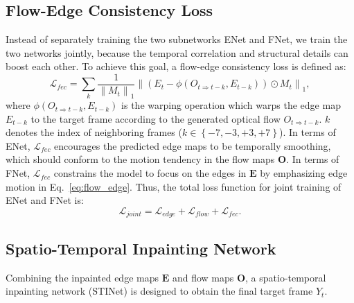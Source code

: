 \subsection{Flow-Edge Consistency Loss}

Instead of separately training the two subnetworks ENet and FNet, we train the two networks jointly, because the temporal correlation and structural details can boost each other.
To achieve this goal, a flow-edge consistency loss is defined as:
%
\begin{equation}
	\label{eq:flow_edge}
	\mathcal{L}_{fec}=\sum_{k}\frac{1}{\left\|M_{t} \right\|_1}\left\|(E_{t}-\phi(O_{t\Rightarrow t-k},E_{t-k}))\odot M_{t}\right\|_1,
\end{equation}
where $\phi(O_{t\Rightarrow t-k},E_{t-k})$ is the warping operation which warps the edge map $E_{t-k}$ to the target frame according to the generated optical flow $O_{t\Rightarrow t-k}$.
$k$ denotes the index of neighboring frames ($k\in \left\{-7,-3,+3,+7 \right\}$). 
In terms of ENet, $\mathcal{L}_{fec}$ encourages the predicted edge maps to be temporally smoothing, which should conform to the motion tendency in the flow maps $\boldsymbol{O}$. 
In terms of FNet, $\mathcal{L}_{fec}$ constrains the model to focus on the edges in $\boldsymbol{E}$ by emphasizing edge motion in Eq.~\ref{eq:flow_edge}. 
Thus, the total loss function for joint training of ENet and FNet is:
\begin{equation}
	\label{eq:flow}
	\mathcal{L}_{joint}=\mathcal{L}_{edge}+\mathcal{L}_{flow}+ \mathcal{L}_{fec}.
\end{equation}







\subsection{Spatio-Temporal Inpainting Network}

Combining the inpainted edge maps $\boldsymbol{E}$ and flow maps $\boldsymbol{O}$, a spatio-temporal inpainting network (STINet) is designed to obtain the final target frame $Y_t$.

